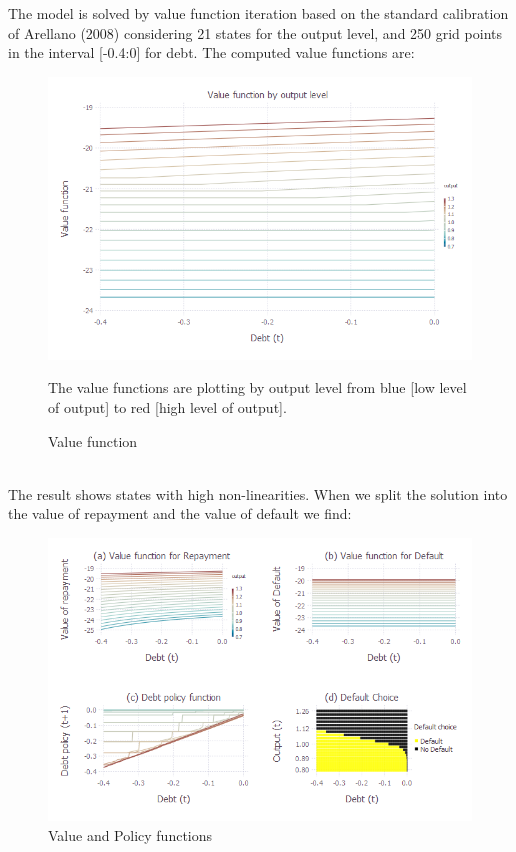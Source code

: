 \documentclass[12pt, a4paper]{article}
\begin{document}
The model is solved by value function iteration based on the standard calibration of Arellano (2008)  considering 21 states for the output level, and 250 grid points in the interval [-0.4:0] for debt. The computed value functions are:
\begin{figure}[!hbt]
	\centering
	\caption{Value function}
	\includegraphics[scale=0.6, trim = 0 12 0 45, clip]{../Plots/ValuFunction.png}
	\begin{minipage}{0.65\textwidth}
	{\scriptsize The value functions are plotting by output level from blue [low level of output]  to red [high level of output].\par}
	\end{minipage}
\end{figure}
\\
The result shows states with high non-linearities. When we split the solution into the value of repayment and the value of default we find: \\
\begin{figure}[!hbt]
	\centering
	\caption{Value and Policy functions}
	\includegraphics[scale=0.55,clip]{../Plots/Model0.png}
\end{figure}
\end{document}
